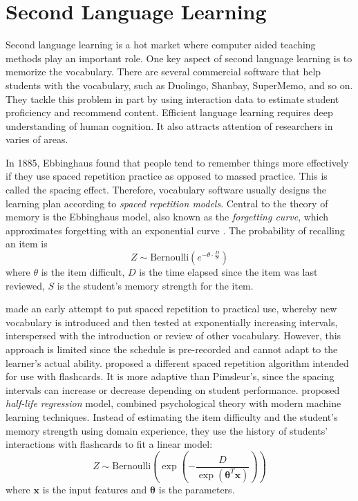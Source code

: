 \section{Second Language Learning}

    Second language learning is a hot market where computer aided teaching methods play an important role.
    One key aspect of second language learning is to memorize the vocabulary.
    There are several commercial software that help students with the vocabulary,
    such as Duolingo\cite{duolingo}, Shanbay\cite{shanbay}, SuperMemo\cite{supermemo}, and so on.
    They tackle this problem in part by using interaction data to estimate student proficiency and recommend content.
    Efficient language learning requires deep understanding of human cognition.
    It also attracts attention of researchers in varies of areas.

    In 1885, Ebbinghaus found that people tend to remember things more effectively
    if they use spaced repetition practice as opposed to massed practice. \cite{ebbinghaus2013memory}
    This is called the spacing effect.
    Therefore, vocabulary software usually designs the learning plan according to \emph{spaced repetition models}.
    Central to the theory of memory is the Ebbinghaus model, also known as the \emph{forgetting curve},
    which approximates forgetting with an exponential curve \cite{bliss1993synaptic}.
    The probability of recalling an item is \cite{reddy2016unbounded}
    \[ Z \sim \mathrm{Bernoulli}\left( e^{-\theta\cdot\frac{D}{S}} \right) \]
    where $\theta$ is the item difficult,
    $D$ is the time elapsed since the item was last reviewed,
    $S$ is the student's memory strength for the item.

    \textcite{pimsleur1967memory} made an early attempt to put spaced repetition to practical use,
    whereby new vocabulary is introduced and then tested at exponentially increasing intervals,
    interspersed with the introduction or review of other vocabulary.
    However, this approach is limited since the schedule is pre-recorded and cannot adapt to the learner's actual ability.
    \textcite{leitner1972so} proposed a different spaced repetition algorithm intended for use with flashcards.
    It is more adaptive than Pimsleur's,
    since the spacing intervals can increase or decrease depending on student performance.
    \textcite{settles2016trainable} proposed \emph{half-life regression} model,
    combined psychological theory with modern machine learning techniques.
    Instead of estimating the item difficulty and the student's memory strength using domain experience,
    they use the history of students' interactions with flashcards to fit a linear model:
    \[ Z \sim \mathrm{Bernoulli}\left( \exp\left( -\frac{D}{\exp(\bm{\theta}^T\bm{x})} \right)\right) \]
    where $\bm{x}$ is the input features and $\bm{\theta}$ is the parameters.

